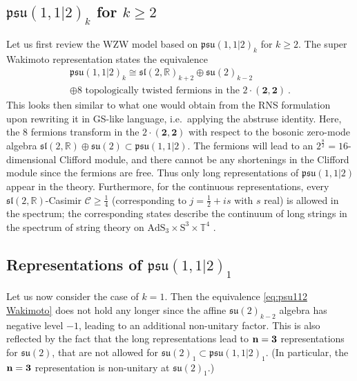 \documentclass[12pt,a4paper]{article}
\begin{document}
\subsection{$\mathfrak{psu}(1,1|2)_k$ for $k \ge 2$} \label{sec:psu112k for kge2}
Let us first review the WZW model based on $\mathfrak{psu}(1,1|2)_k$ for $k \ge 2$. The super Wakimoto representation states the equivalence \cite{Bars:1990hx, Berkovits:1999im, Gotz:2006qp}
\begin{multline}
\mathfrak{psu}(1,1|2)_k \cong \mathfrak{sl}(2,\mathds{R})_{k+2} \oplus \mathfrak{su}(2)_{k-2} \\ \oplus \text{8 topologically twisted fermions in the $2 \cdot (\mathbf{2},\mathbf{2})$}\ . \label{eq:psu112 Wakimoto}
\end{multline}
This looks then similar to what one would obtain from the RNS  formulation upon rewriting it in GS-like language, i.e.\ applying the abstruse identity. %
Here, the 8 fermions transform in the $2 \cdot (\mathbf{2},\mathbf{2})$ with respect to the bosonic zero-mode algebra $\mathfrak{sl}(2,\mathds{R}) \oplus \mathfrak{su}(2) \subset \mathfrak{psu}(1,1|2)$. 
The fermions will lead to an $2^{\frac{8}{2}}=16$-dimensional Clifford module, and there cannot be any shortenings in the Clifford module since the fermions are free. Thus only long representations of $\mathfrak{psu}(1,1|2)$ appear in the theory. Furthermore, for the continuous representations, every $\mathfrak{sl}(2,\mathds{R})$-Casimir $\mathcal{C} \ge \tfrac{1}{4}$ (corresponding to $j=\frac{1}{2} + is$ with $s$ real) is allowed in the spectrum; the corresponding states describe the continuum of long strings in the spectrum of string theory on $\mathrm{AdS}_3 \times \mathrm{S}^3 \times \mathbb{T}^4$ \cite{Maldacena:2000hw}.


\subsection{Representations of $\mathfrak{psu}(1,1|2)_1$}\label{sec:4.2}
Let us now consider the case of $k=1$. Then the equivalence \eqref{eq:psu112 Wakimoto} does not hold any longer since the affine $\mathfrak{su}(2)_{k-2}$ algebra has negative level $-1$, leading to an additional non-unitary factor. This is also reflected by the fact that the long representations lead to ${\bf n}={\bf 3}$ representations for $\mathfrak{su}(2)$, that are not allowed for $\mathfrak{su}(2)_1 \subset \mathfrak{psu}(1,1|2)_1$. (In particular, the ${\bf n}={\bf 3}$ representation is non-unitary at $\mathfrak{su}(2)_{1}$.) 
\end{document}
